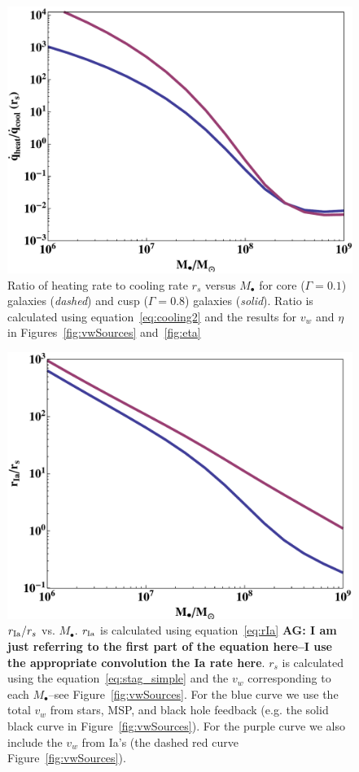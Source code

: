 \documentclass[usenatbib,fleqn]{mn2e}
\newcommand{\rs}{r_s}
\newcommand{\Mbh}[1][]{M_{\bullet#1}}
\newcommand{\rIa}{r_{\rm Ia}}
\newcommand{\vwO}{v_{w}}
\begin{document}
\begin{figure}
\includegraphics[width=\columnwidth]{cooling2.pdf}
\caption{\label{fig:cooling2} Ratio of heating rate to cooling rate
  $\rs$ versus $\Mbh$ for core ($\Gamma=0.1$) galaxies ({\it dashed})
  and cusp ($\Gamma=0.8$) galaxies ({\it solid}). Ratio is calculated
  using equation~\eqref{eq:cooling2} and the results for $\vwO$ and
  $\eta$ in Figures~\ref{fig:vwSources} and~\ref{fig:eta}}
\end{figure}


\begin{figure}
\includegraphics[width=\columnwidth]{rs_rIa.pdf}
\caption{\label{fig:rs_rIa} $\rIa/\rs$ vs. $\Mbh$. $\rIa$ is
  calculated using equation~\eqref{eq:rIa} {\bf AG: I am just
    referring to the first part of the equation here--I use the
    appropriate convolution the Ia rate here}. $\rs$ is calculated
  using the equation~\eqref{eq:stag_simple} and the $\vwO$
  corresponding to each $\Mbh$--see Figure~\ref{fig:vwSources}. For
  the blue curve we use the total $\vwO$ from stars, MSP, and
  black hole feedback (e.g. the solid black curve in
  Figure~\ref{fig:vwSources}). For the purple curve we also include
  the $\vwO$ from Ia's (the dashed red curve
  Figure~\ref{fig:vwSources}).}
\end{figure}
\end{document}
